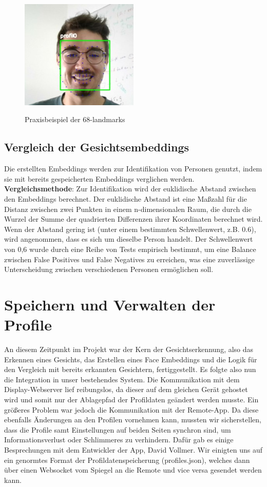 \begin{figure}[h!]
    \centering
    \includegraphics[width=0.5\textwidth]{pictures/68landmarks.jpg}
    \caption{Praxisbeispiel der 68-landmarks}
    \label{fig:68landmarks}
    \cite{68landmarks}
\end{figure}

\subsection{Vergleich der Gesichtsembeddings}
Die erstellten Embeddings werden zur Identifikation von Personen genutzt, indem sie mit bereits gespeicherten Embeddings verglichen werden. \\

\noindent \textbf{Vergleichsmethode}:
Zur Identifikation wird der euklidische Abstand zwischen den Embeddings berechnet. Der euklidische Abstand ist eine Maßzahl für die Distanz zwischen zwei Punkten in einem n-dimensionalen Raum, die durch die Wurzel der Summe der quadrierten Differenzen ihrer Koordinaten berechnet wird. Wenn der Abstand gering ist (unter einem bestimmten Schwellenwert, z.B. 0.6), wird angenommen, dass es sich um dieselbe Person handelt. Der Schwellenwert von 0,6 wurde durch eine Reihe von Tests empirisch bestimmt, um eine Balance zwischen False Positives und False Negatives zu erreichen, was eine zuverlässige Unterscheidung zwischen verschiedenen Personen ermöglichen soll.

\section{Speichern und Verwalten der Profile}

An diesem Zeitpunkt im Projekt war der Kern der Gesichtserkennung, also das Erkennen eines Gesichts, das Erstellen eines Face Embeddings und die Logik für den Vergleich mit bereits erkannten Gesichtern, fertiggestellt. Es folgte also nun die Integration in unser bestehendes System. Die Kommunikation mit dem Display-Webserver lief reibungslos, da dieser auf dem gleichen Gerät gehostet wird und somit nur der Ablagepfad der Profildaten geändert werden musste. Ein größeres Problem war jedoch die Kommunikation mit der Remote-App. Da diese ebenfalls Änderungen an den Profilen vornehmen kann, mussten wir sicherstellen, dass die Profile samt Einstellungen auf beiden Seiten synchron sind, um Informationsverlust oder Schlimmeres zu verhindern. Dafür gab es einige Besprechungen mit dem Entwickler der App, David Vollmer. Wir einigten uns auf ein genormtes Format der Profildatenspeicherung (profiles.json), welches dann über einen Websocket vom Spiegel an die Remote und vice versa gesendet werden kann.
